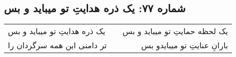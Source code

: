 \begin{center}
\section*{شماره ۷۷: یک ذره هدایتِ تو میباید و بس}
\label{sec:077}
\begin{longtable}{l p{0.5cm} r}
یک ذره هدایتِ تو میباید و بس
&&
یک لحظه حمایتِ تو میباید و بس
\\
تر دامنی این همه سرگردان را
&&
بارانِ عنایتِ تو میبایدو بس
\\
\end{longtable}
\end{center}
